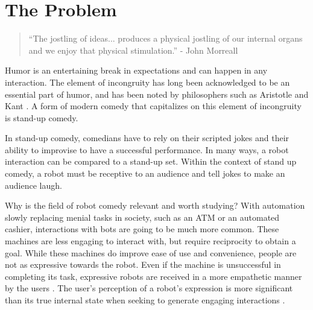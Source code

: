 \documentclass[onecolumn, draftclsnofoot,10pt, compsoc]{IEEEtran}
\begin{document}
\newpage
{}
\tableofcontents
\clearpage

\section{The Problem}

\begin{quote}
``The jostling of ideas... produces a physical jostling of our internal organs and we enjoy that physical stimulation.'' - John Morreall
\end{quote}
Humor is an entertaining break in expectations and can happen in any interaction. The element of incongruity has long been acknowledged to be an essential part of humor, and has been noted by philosophers such as Aristotle and Kant {\cite{StanfordHum:2016}}. A form of modern comedy that capitalizes on this element of incongruity is stand-up comedy.

In stand-up comedy, comedians have to rely on their scripted jokes and their ability to improvise to have a successful performance. In many ways, a robot interaction can be compared to a stand-up set. Within the context of stand up comedy, a robot must be receptive to an audience and tell jokes to make an audience laugh. 
 
Why is the field of robot comedy relevant and worth studying? With automation slowly replacing menial tasks in society, such as an ATM or an automated cashier, interactions with bots are going to be much more common. These machines are less engaging to interact with, but require reciprocity to obtain a goal. While these machines do improve ease of use and convenience, people are not as expressive towards the robot. Even if the machine is unsuccessful in completing its task, expressive robots are received in a more empathetic manner by the users {\cite{DesignExBeh:2017}}. The user’s perception of a robot’s expression is more significant than its true internal state when seeking to generate engaging interactions {\cite{KnightEightLessons:2011}}. 
\end{document}
